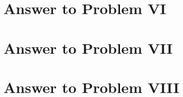 \documentclass[11pt,a4paper]{article}
\begin{document}
\clearpage
\section{Answer to Problem VI}\label{sec:P06}



\clearpage
\section{Answer to Problem VII}\label{sec:P07}



\clearpage
\section{Answer to Problem VIII}\label{sec:P08} %
\end{document}
